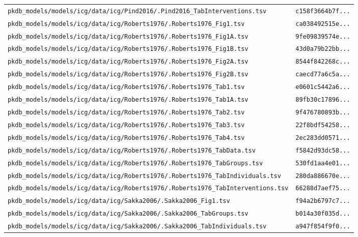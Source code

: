 \documentclass{article}
\begin{document}
\begin{longtable}{ll}
\texttt{pkdb\_models/models/icg/data/icg/Pind2016/.Pind2016\_TabInterventions.tsv} & \texttt{c158f3664b7f...} \\
\texttt{pkdb\_models/models/icg/data/icg/Roberts1976/.Roberts1976\_Fig1.tsv} & \texttt{ca038492515e...} \\
\texttt{pkdb\_models/models/icg/data/icg/Roberts1976/.Roberts1976\_Fig1A.tsv} & \texttt{9fe09839574e...} \\
\texttt{pkdb\_models/models/icg/data/icg/Roberts1976/.Roberts1976\_Fig1B.tsv} & \texttt{43d0a79b22bb...} \\
\texttt{pkdb\_models/models/icg/data/icg/Roberts1976/.Roberts1976\_Fig2A.tsv} & \texttt{8544f842268c...} \\
\texttt{pkdb\_models/models/icg/data/icg/Roberts1976/.Roberts1976\_Fig2B.tsv} & \texttt{caecd77a6c5a...} \\
\texttt{pkdb\_models/models/icg/data/icg/Roberts1976/.Roberts1976\_Tab1.tsv} & \texttt{e0601c5442a6...} \\
\texttt{pkdb\_models/models/icg/data/icg/Roberts1976/.Roberts1976\_Tab1A.tsv} & \texttt{89fb30c17896...} \\
\texttt{pkdb\_models/models/icg/data/icg/Roberts1976/.Roberts1976\_Tab2.tsv} & \texttt{9f476780893b...} \\
\texttt{pkdb\_models/models/icg/data/icg/Roberts1976/.Roberts1976\_Tab3.tsv} & \texttt{22f8bdf54258...} \\
\texttt{pkdb\_models/models/icg/data/icg/Roberts1976/.Roberts1976\_Tab4.tsv} & \texttt{2ec283dd0571...} \\
\texttt{pkdb\_models/models/icg/data/icg/Roberts1976/.Roberts1976\_TabData.tsv} & \texttt{f5842d93dc58...} \\
\texttt{pkdb\_models/models/icg/data/icg/Roberts1976/.Roberts1976\_TabGroups.tsv} & \texttt{530fd1aa4e01...} \\
\texttt{pkdb\_models/models/icg/data/icg/Roberts1976/.Roberts1976\_TabIndividuals.tsv} & \texttt{280da886670e...} \\
\texttt{pkdb\_models/models/icg/data/icg/Roberts1976/.Roberts1976\_TabInterventions.tsv} & \texttt{66288d7aef75...} \\
\texttt{pkdb\_models/models/icg/data/icg/Sakka2006/.Sakka2006\_Fig1.tsv} & \texttt{f94a2b6797c7...} \\
\texttt{pkdb\_models/models/icg/data/icg/Sakka2006/.Sakka2006\_TabGroups.tsv} & \texttt{b014a30f035d...} \\
\texttt{pkdb\_models/models/icg/data/icg/Sakka2006/.Sakka2006\_TabIndividuals.tsv} & \texttt{a947f854f9f0...} \\

\end{longtable}
\end{document}
